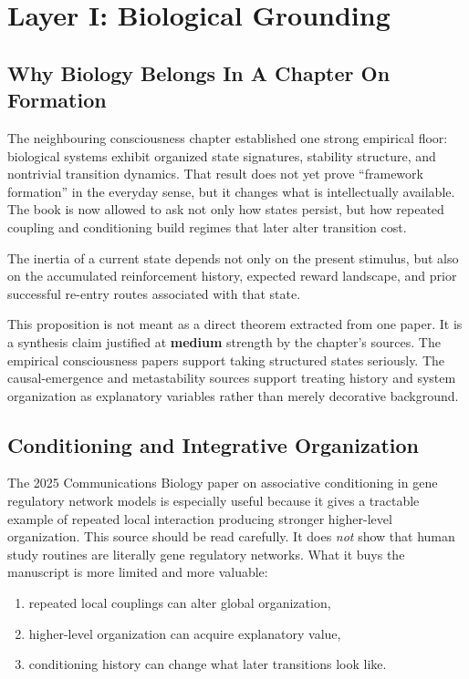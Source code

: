 \section{Layer I: Biological Grounding}

\subsection{Why Biology Belongs In A Chapter On Formation}

The neighbouring consciousness chapter established one strong empirical floor:
biological systems exhibit organized state signatures, stability structure, and
nontrivial transition dynamics. That result does not yet prove ``framework
formation'' in the everyday sense, but it changes what is intellectually
available. The book is now allowed to ask not only how states persist, but how
repeated coupling and conditioning build regimes that later alter transition
cost.

\begin{proposition}
The inertia of a current state depends not only on the present stimulus, but
also on the accumulated reinforcement history, expected reward landscape, and
prior successful re-entry routes associated with that state.
\end{proposition}

\begin{discussion}
This proposition is not meant as a direct theorem extracted from one paper. It
is a synthesis claim justified at \textbf{medium} strength by the chapter's
sources. The empirical consciousness papers support taking structured states
seriously. The causal-emergence and metastability sources support treating
history and system organization as explanatory variables rather than merely
decorative background.
\end{discussion}

\subsection{Conditioning and Integrative Organization}

The 2025 Communications Biology paper on associative conditioning in gene
regulatory network models is especially useful because it gives a tractable
example of repeated local interaction producing stronger higher-level
organization. This source should be read carefully. It does \emph{not} show
that human study routines are literally gene regulatory networks. What it buys
the manuscript is more limited and more valuable:
\begin{enumerate}[nosep]
  \item repeated local couplings can alter global organization,
  \item higher-level organization can acquire explanatory value,
  \item conditioning history can change what later transitions look like.
\end{enumerate}

